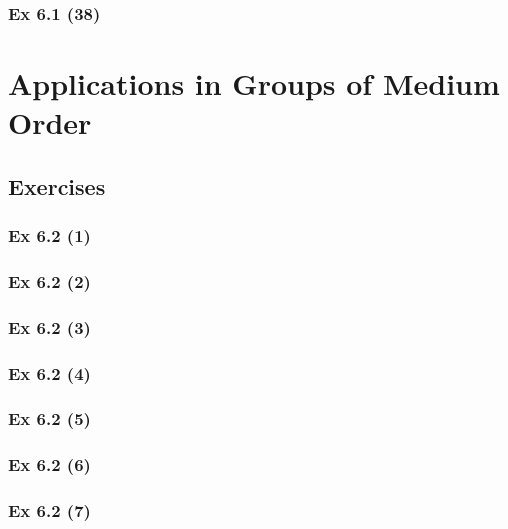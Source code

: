 \subsubsection{Ex 6.1 (38)}\label{sec:Ex_6.1.38}

\newpage		%

\section{Applications in Groups of Medium Order}\label{sec:6.2}	
\subsection*{Exercises}\label{sec:6.2_Exercises}

\subsubsection{Ex 6.2 (1)}\label{sec:Ex_6.2.1}

\subsubsection{Ex 6.2 (2)}\label{sec:Ex_6.2.2}

\subsubsection{Ex 6.2 (3)}\label{sec:Ex_6.2.3}

\subsubsection{Ex 6.2 (4)}\label{sec:Ex_6.2.4}

\subsubsection{Ex 6.2 (5)}\label{sec:Ex_6.2.5}

\subsubsection{Ex 6.2 (6)}\label{sec:Ex_6.2.6}

\subsubsection{Ex 6.2 (7)}\label{sec:Ex_6.2.7}

